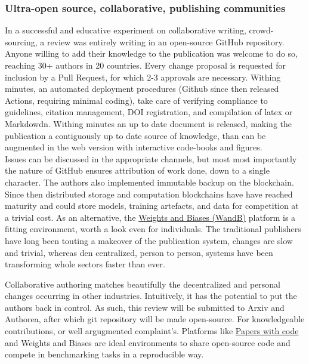 \subsubsection{Ultra-open source, collaborative, publishing communities}
In a successful and educative experiment on collaborative writing, crowd-sourcing, a review was entirely writing in an open-source GitHub repository. Anyone willing to add their knowledge to the publication was welcome to do so, reaching 30+ authors in 20 countries. Every change proposal is requested for inclusion by a Pull Request, for which 2-3 approvals are necessary. Withing minutes, an automated deployment procedures (Github since then released Actions, requiring minimal coding), take care of verifying compliance to guidelines, citation management, DOI registration, and compilation of latex or Markdowdn. Withing minutes an up to date document is released, making the publication a contiguously up to date source of knowledge, than can be augmented in the web version with interactive code-books and figures.\\ 
Issues can be discussed in the appropriate channels, but most most importantly the nature of GitHub ensures attribution of work done, down to a single character. The authors also implemented immutable backup on the blockchain. Since then distributed storage and computation blockchains have have reached maturity and could store models, training artefacts, and data for competition at a trivial cost. As an alternative,  the \href{http://bit.ly/WandB-ML}{Weights and Biases (WandB)} platform is a fitting environment, worth a look even for individuals. The traditional publishers have long been touting a makeover of the publication system, changes are slow and trivial, whereas den centralized, person to person, systems have been transforming whole sectors faster than ever.\\

\begin{tcolorbox}[sharp corners, colback=teal!10, colframe=teal!80, title=Bringing together researchers to address reproducibility and open science]
 Collaborative authoring matches beautifully the decentralized and personal changes occurring in other industries. Intuitively, it has the potential to put the authors back in control. As such, this review will be submitted to Arxiv and Authorea, after which git repository will be made open-source. For knowledgeable contributions, or well argugmented complaint's.
Platforms like \href{}{Papers with code} and Weights and Biases \cite{wandb} are ideal environments to share open-source code and compete in benchmarking tasks in a reproducible way.
\end{tcolorbox}

